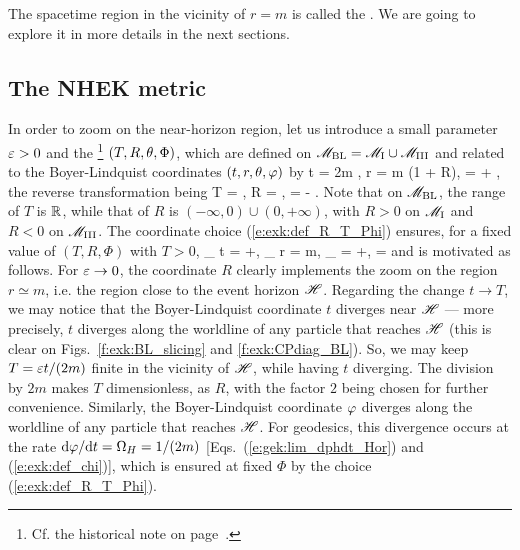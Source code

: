 The spacetime region in the vicinity of $r=m$ is called the
.
We are going to explore it in more details in the next sections.

\subsection{The NHEK metric} \label{s:exk:NHEK_metric}

In order to zoom on the near-horizon region, let us introduce
a small parameter $\varepsilon >0$ and
the \footnote{Cf. the historical note on
page~\pageref{h:exk:NHEK_metric}.} $(T,R,\theta,\Phi)$, which are defined on $\mathscr{M}_{\rm BL} = \mathscr{M}_{\rm I} \cup \mathscr{M}_{\rm III}$
and related to the Boyer-Lindquist coordinates
$(t,r,\theta,\varphi)$ by
\be \label{e:exk:def_R_T_Phi}
    t = 2m ,\quad
    r = m (1 + \veps R),\quad
    \ph = \Phi +  ,
\ee
the reverse transformation being
\be \label{e:exk:R_T_Phi_BL}
    T = \veps {}, \quad
    R = , \quad
    \Phi = \ph -  .
\ee
Note that on $\mathscr{M}_{\rm BL}$, the range of $T$ is $\mathbb{R}$, while
that of $R$ is $(-\infty,0)\cup(0,+\infty)$, with $R>0$ on $\mathscr{M}_{\rm I}$
and $R<0$ on $\mathscr{M}_{\rm III}$.
The coordinate choice (\ref{e:exk:def_R_T_Phi}) ensures, for a fixed value of $(T,R,\Phi)$ with $T>0$,
\be
    \lim_{\veps{}} t = +\infty,\quad
    \lim_{\veps{}} r = m, \quad
    \lim_{\veps{}} \ph = +\infty,\quad
     = 
\ee
and is motivated as follows.
For $\varepsilon\to 0$,
the coordinate $R$ clearly implements the zoom on the region $r\simeq m$,
i.e. the region close to the event horizon $\mathscr{H}$.
Regarding the change $t\to T$, we may notice that the Boyer-Lindquist coordinate
$t$ diverges near  $\mathscr{H}$ --- more precisely,
$t$ diverges along the worldline of any particle that reaches $\mathscr{H}$
(this is clear on Figs.~\ref{f:exk:BL_slicing} and \ref{f:exk:CPdiag_BL}).
So, we may keep $T = \varepsilon t/(2m)$ finite in the vicinity of $\mathscr{H}$, while having
$t$ diverging. The division by $2m$ makes $T$ dimensionless, as $R$, with the
factor $2$ being chosen for further convenience.
Similarly, the Boyer-Lindquist coordinate $\varphi$ diverges along the worldline of any particle that reaches $\mathscr{H}$.
For geodesics, this divergence occurs at the rate $\mathrm{d}\varphi/\mathrm{d} t = \Omega_H = 1/(2m)$
[Eqs.~(\ref{e:gek:lim_dphdt_Hor}) and (\ref{e:exk:def_chi})], which is ensured
at fixed $\Phi$ by the choice (\ref{e:exk:def_R_T_Phi}).

